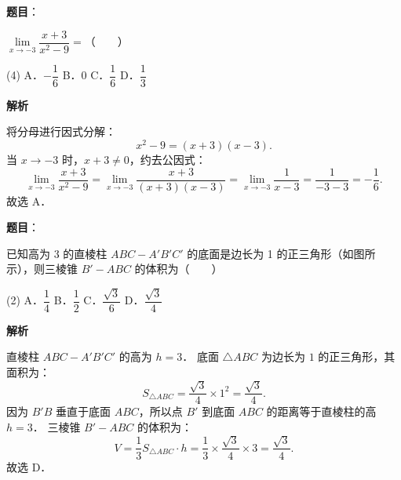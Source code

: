 \begin{answer}

\textbf{题目}：

$\lim\limits_{x\to-3} \dfrac{x + 3}{x^2 - 9} =$\mbox{（　　）}

\begin{gkopts}(4)
\task A．$-\dfrac{1}{6}$
\task B．$0$
\task C．$\dfrac{1}{6}$
\task D．$\dfrac{1}{3}$
\end{gkopts}

\textbf{解析}

将分母进行因式分解：
\nopagebreak[4]
\[
x^2 - 9 = (x + 3)(x - 3).
\]
当 $x \to -3$ 时，$x + 3 \neq 0$，约去公因式：
\nopagebreak[4]
\[
\lim_{x\to-3} \frac{x + 3}{x^2 - 9} = \lim_{x\to-3} \frac{x + 3}{(x + 3)(x - 3)} = \lim_{x\to-3} \frac{1}{x - 3} = \frac{1}{-3 - 3} = -\frac{1}{6}.
\]
故选 A．


\end{answer}
\begin{answer}

\textbf{题目}：

已知高为 3 的直棱柱 $ABC - A'B'C'$ 的底面是边长为 1 的正三角形（如图所示），则三棱锥 $B' - ABC$ 的体积为\mbox{（　　）}
\nopagebreak[4]
\begin{center}\end{center}
\nopagebreak[4]
\begin{gkopts}(2)
\task A．$\dfrac{1}{4}$
\task B．$\dfrac{1}{2}$
\task C．$\dfrac{\sqrt{3}}{6}$
\task D．$\dfrac{\sqrt{3}}{4}$
\end{gkopts}

\textbf{解析}

直棱柱 $ABC - A'B'C'$ 的高为 $h = 3$．
底面 $\triangle ABC$ 为边长为 $1$ 的正三角形，其面积为：
\nopagebreak[4]
\[
S_{\triangle ABC} = \frac{\sqrt{3}}{4} \times 1^2 = \frac{\sqrt{3}}{4}.
\]
因为 $B'B$ 垂直于底面 $ABC$，所以点 $B'$ 到底面 $ABC$ 的距离等于直棱柱的高 $h = 3$．
三棱锥 $B' - ABC$ 的体积为：
\nopagebreak[4]
\[
V = \frac{1}{3} S_{\triangle ABC} \cdot h = \frac{1}{3} \times \frac{\sqrt{3}}{4} \times 3 = \frac{\sqrt{3}}{4}.
\]
故选 D．


\end{answer}
